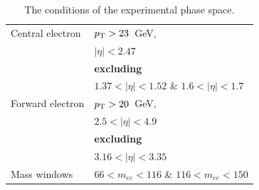 \begin{table}
\centering
\begin{tabular}{l l}
\hline \hline
Central electron & $p_{\mathrm{T}} > 23$~GeV, \\
\rule{0pt}{4ex}  & $|\eta| < 2.47$ \\
                 & {\bf excluding} \\
                 & $1.37 < |\eta| < 1.52$ \& $1.6 < |\eta| < 1.7$ \\
\hline
Forward electron & $p_{\mathrm{T}} > 20$~GeV, \\
\rule{0pt}{4ex}  & $2.5 < |\eta| < 4.9$ \\
                 & {\bf excluding} \\
                 & $3.16 < |\eta| < 3.35$ \\
\hline
Mass windows     & $66 < m_{ee} < 116$ \& $116 < m_{ee} < 150$ \\
\hline \hline
\end{tabular}
\caption{The conditions of the experimental phase space.}
\label{tab:res_phase_space}
\end{table}


\begin{figure}
\end{figure}

